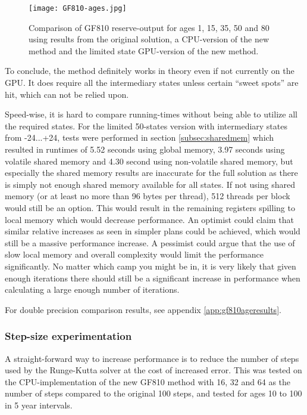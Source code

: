 \begin{figure}[h!]\centering
\texttt{[image: GF810-ages.jpg]}
\caption{Comparison of GF810 reserve-output for ages 1, 15, 35, 50 and 80 using results from the original solution, a CPU-version of the new method and the limited state GPU-version of the new method.\label{fig:gf810ages}}
\end{figure}

To conclude, the method definitely works in theory even if not currently on the GPU.
It does require all the intermediary states unless certain ``sweet spots'' are hit, which can not be relied upon.

Speed-wise, it is hard to compare running-times without being able to utilize all the required states.
For the limited 50-states version with intermediary states from -24...+24, tests were performed in section \ref{subsec:sharedmem} which resulted in runtimes of 5.52 seconds using global memory, 3.97 seconds using volatile shared memory and 4.30 second using non-volatile shared memory, but especially the shared memory results are inaccurate for the full solution as there is simply not enough shared memory available for all states.
If not using shared memory (or at least no more than 96 bytes per thread), 512 threads per block would still be an option.
This would result in the remaining registers spilling to local memory which would decrease performance.
An optimist could claim that similar relative increases as seen in simpler plans could be achieved, which would still be a massive performance increase.
A pessimist could argue that the use of slow local memory and overall complexity would limit the performance significantly.
No matter which camp you might be in, it is very likely that given enough iterations there should still be a significant increase in performance when calculating a large enough number of iterations.

For double precision comparison results, see appendix \ref{app:gf810ageresults}.

\subsubsection{Step-size experimentation}
A straight-forward way to increase performance is to reduce the number of steps used by the Runge-Kutta solver at the cost of increased error.
This was tested on the CPU-implementation of the new GF810 method with 16, 32 and 64 as the number of steps compared to the original 100 steps, and tested for ages 10 to 100 in 5 year intervals.

